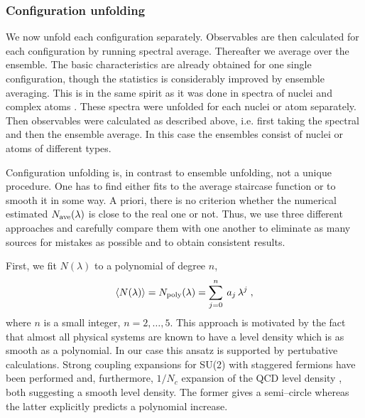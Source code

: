 \subsubsection{Configuration unfolding}
\label{sec312}
We now unfold each configuration separately.  Observables are then
calculated for each configuration by running spectral average.
Thereafter we average over the ensemble. The basic characteristics are
already obtained for one single configuration, though the statistics
is considerably improved by ensemble averaging.  This is in the same
spirit as it was done in spectra of nuclei \cite{bohigas83} and
complex atoms \cite{rosen60}.  These spectra were unfolded for each
nuclei or atom separately.  Then observables were calculated as
described above, i.e. first taking the spectral and then the ensemble
average. In this case the ensembles consist of nuclei or atoms of
different types.

Configuration unfolding is, in contrast to ensemble unfolding, not a
unique procedure. One has to find either fits to the average staircase
function or to smooth it in some way. A priori, there is no criterion
whether the numerical estimated $N_{\rm ave}(\lambda)$ is close to the
real one or not.  Thus, we use three different approaches and
carefully compare them with one another to eliminate as many sources
for mistakes as possible and to obtain consistent results.

First, we fit $N(\lambda)$ to a polynomial of degree $n$,
\begin{equation}
\langle N(\lambda)\rangle
 =N_{\rm poly}(\lambda)=\sum_{j=0}^n\:a_j\,\lambda^j\;,
\label{poly}
\end{equation}
where $n$ is a small integer, $n=2,\ldots,5$.  This approach is
motivated by the fact that almost all physical systems are known to
have a level density which is as smooth as a polynomial. In our case
this ansatz is supported by pertubative calculations. Strong coupling
expansions for SU(2) with staggered fermions have been performed
\cite{kogut83} and, furthermore, $1/N_c$ expansion of the QCD level
density \cite{smilga93}, both suggesting a smooth level density. The
former gives a semi--circle whereas the latter explicitly predicts a
polynomial increase.

